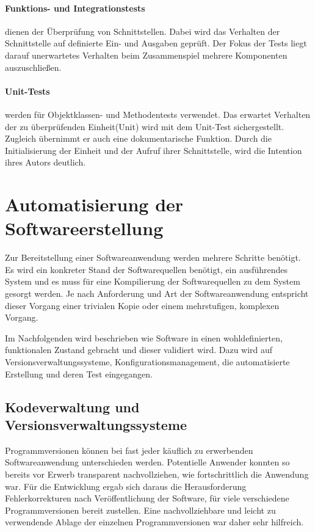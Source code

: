 \paragraph{Funktions- und Integrationstests}

dienen der Überprüfung von Schnittstellen. Dabei wird das Verhalten der Schnittstelle auf definierte Ein- und Ausgaben geprüft. Der Fokus der Tests liegt darauf unerwartetes Verhalten beim Zusammenspiel mehrere Komponenten auszuschließen.

\paragraph{Unit-Tests}

werden für Objektklassen- und Methodentests verwendet. Das erwartet Verhalten der zu überprüfenden Einheit(Unit) wird mit dem Unit-Test sichergestellt. Zugleich übernimmt er auch eine dokumentarische Funktion. Durch die Initialisierung der Einheit und der Aufruf ihrer Schnittstelle, wird die Intention ihres Autors deutlich.

\section{Automatisierung der Softwareerstellung}
\label{sec:automation-software}

Zur Bereitstellung einer Softwareanwendung werden mehrere Schritte benötigt. Es wird ein konkreter Stand der Softwarequellen benötigt, ein ausführendes System und es muss für eine Kompilierung der Softwarequellen zu dem System gesorgt werden.
Je nach Anforderung und Art der Softwareanwendung entspricht dieser Vorgang einer trivialen Kopie oder einem mehrstufigen, komplexen Vorgang. 

Im Nachfolgenden wird beschrieben wie Software in einen wohldefinierten, funktionalen Zustand gebracht und dieser validiert wird. Dazu wird auf Versionsverwaltungssysteme, Konfigurationsmanagement, die automatisierte Erstellung und deren Test eingegangen.

\subsection{Kodeverwaltung und Versionsverwaltungssysteme}

Programmversionen können bei fast jeder käuflich zu erwerbenden Softwareanwendung unterschieden werden. Potentielle 
Anwender konnten so bereits vor Erwerb transparent nachvollziehen, wie fortschrittlich die Anwendung war.
Für die Entwicklung ergab sich daraus die Herausforderung Fehlerkorrekturen nach Veröffentlichung der Software, für viele 
verschiedene Programmversionen bereit zustellen.
Eine nachvollziehbare und leicht zu verwendende Ablage der einzelnen Programmversionen war daher sehr hilfreich.


